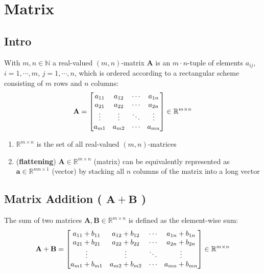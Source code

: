 \chapter{Matrix \cite{mfml-1}}\label{chapter: Matrix}

\section*{Intro \cite{mfml-1}}

With $m, n \in \mathbb{N}$ a real-valued $(m, n)$-matrix $\mathbf{A}$ is an $m\cdot n$-tuple of elements $a_{ij}$, $i = 1, \cdots , m$, $j = 1, \cdots , n$, which is ordered according to a rectangular scheme consisting of $m$ rows and $n$ columns:
\[
    \hfill
    \mathbf{A} = \begin{bmatrix}
        a_{11} & a_{12} & \cdots & a_{1n}\\
        a_{21} & a_{22} & \cdots & a_{2n}\\
        \vdots & \vdots & \ddots & \vdots\\
        a_{m1} & a_{m2} & \cdots & a_{mn}\\
    \end{bmatrix}
    \in \mathbb{R}^{m\times n}
    \hfill
\]

\begin{enumerate}
    \item $\mathbb{R}^{m\times n}$ is the set of all real-valued $(m, n)$-matrices

    \item (\textbf{flattening}) $\mathbf{A} \in \mathbb{R}^{m\times n}$ (matrix) can be equivalently represented as $\mathbf{a} \in \mathbb{R}^{mn\times 1}$ (vector) by stacking all $n$ columns of the matrix into a long vector
\end{enumerate}


\section{Matrix Addition ( $\mathbf{A + B}$ ) \cite{mfml-1}}\label{Matrix Addition}
The sum of two matrices $\mathbf{A, B} \in \mathbb{R}^{m\times n}$ is defined as the element-wise sum:
\[
    \hfill
    \mathbf{A + B} = \begin{bmatrix}
        a_{11} + b_{11} & a_{12} + b_{12} & \cdots & a_{1n} + b_{1n}\\
        a_{21} + b_{21} & a_{22} + b_{22} & \cdots & a_{2n} + b_{2n}\\
        \vdots & \vdots & \ddots & \vdots\\
        a_{m1} + b_{m1} & a_{m2} + b_{m2} & \cdots & a_{mn} + b_{mn}\\
    \end{bmatrix}
    \in \mathbb{R}^{m\times n}
    \hfill
\]



